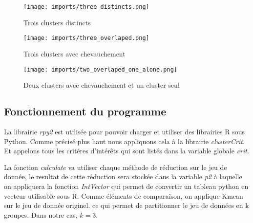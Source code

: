 \begin{center}
    \begin{figure}[ht!]
        \centering
        
        \texttt{[image: imports/three\_distincts.png]}
        
        \caption{Trois clusters distincts}
    \end{figure}
\end{center}

\begin{center}
    \begin{figure}[ht!]
        \centering
        
        \texttt{[image: imports/three\_overlaped.png]}
        
        \caption{Trois clusters avec chevauchement}
    \end{figure}
\end{center}


\begin{center}
    \begin{figure}[ht!]
        \centering
        
        \texttt{[image: imports/two\_overlaped\_one\_alone.png]}
        
        \caption{Deux clusters avec chevauchement et un cluster seul}
    \end{figure}
\end{center}


\subsection{Fonctionnement du programme}
La librairie \textit{rpy2} est utilisée pour pouvoir charger et utiliser des librairies R sous Python. Comme précisé plus haut
nous appliquons cela à la librairie \textit{clusterCrit}. Et appelons tous les critéres d'intérêts qui sont listés dans la variable globale \textit{crit}.

La fonction \textit{calculate} va utiliser chaque méthode de réduction sur le jeu de donnée, le resultat de cette réduction sera stockée dans
la variable \textit{p2} à laquelle on appliquera la fonction \textit{IntVector} qui permet de convertir un tableau python en vecteur utilisable sous R. 
Comme éléments de comparaison, on applique Kmean sur le jeu de donnée originel. ce qui permet de partitionner le jeu de données en k groupes. 
Dans notre cas, $k = 3$.

